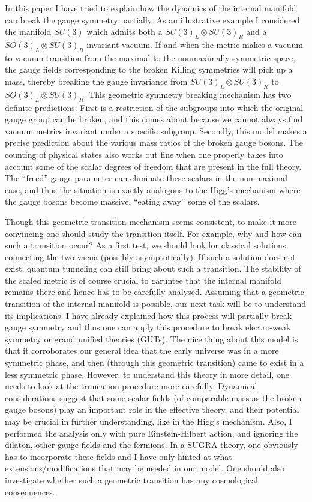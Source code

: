 \documentclass[a4paper,12pt]{article}
\begin{document}
In this paper I have tried to explain how the dynamics of the internal manifold can break the gauge symmetry partially. As an illustrative example I considered the manifold $SU(3)$ which admits both a $SU(3)_L\otimes SU(3)_R$ and a  $SO(3)_L\otimes SU(3)_R$ invariant vacuum. If and when the metric makes a vacuum to vacuum transition from the maximal to the nonmaximally symmetric space, the gauge fields corresponding to the broken Killing symmetries will pick up a mass, thereby breaking the gauge invariance from $SU(3)_L\otimes SU(3)_R$ to $SO(3)_L\otimes SU(3)_R$. This geometric symmetry breaking mechanism  has two definite predictions. First is a restriction of the subgroups into which the original gauge group can be broken, and this comes about because we cannot always find vacuum metrics invariant under a specific subgroup. Secondly, this model makes a precise prediction about the various mass ratios of the broken gauge bosons. The counting of physical states also works out fine when one properly takes into account some of the scalar degrees of freedom that are present in the full theory. The ``freed'' gauge parameter can eliminate these scalars in the non-maximal case, and thus the situation is exactly analogous to the Higg's mechanism where the gauge bosons become massive, ``eating away'' some of the scalars.

Though this geometric transition mechanism seems consistent, to make it more convincing one should study the transition itself. For example, why and how can such a transition occur? As a first test, we should  look for classical solutions connecting the two vacua (possibly asymptotically). If such a solution does not exist, quantum tunneling can still bring about such a transition. The stability of the scaled metric is of course crucial to garuntee that the internal manifold remains there and hence has to be carefully analysed. Assuming that a geometric transition of the internal manifold is possible, our next task will be to understand its implications. I have already explained how this process will partially break gauge symmetry and thus  one can apply this procedure to break electro-weak symmetry or  grand unified theories (GUTs). The nice thing about this model is that it corroborates our general idea that the early universe was in a more symmetric phase, and then (through this geometric transition) came to exist in a less symmetric phase. However, to understand this theory in more detail, one needs to look at the truncation procedure more carefully. Dynamical considerations suggest that some scalar fields (of comparable mass as the broken gauge bosons) play an important role in the effective theory, and their potential may be crucial in further understanding, like in the Higg's mechanism. Also, I performed the analysis only with pure Einstein-Hilbert action, and ignoring the dilaton, other gauge fields and the fermions. In a SUGRA theory, one obviously has to incorporate these fields and I have only hinted at what extensions/modifications that may be needed in our model. One should also investigate whether such a geometric transition has any  cosmological consequences.
\end{document}
